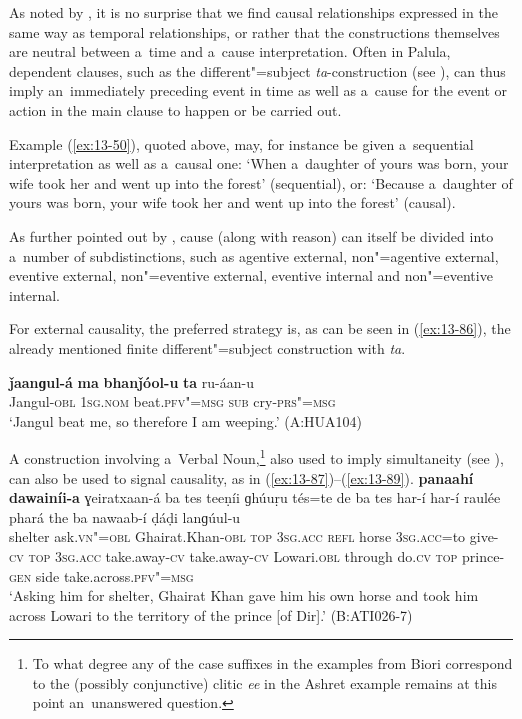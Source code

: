 As noted by \citet[247]{thompsonetal2007}, it is no surprise that we find causal relationships expressed in the same way as temporal relationships, or rather that the constructions themselves are neutral between a~time and a~cause interpretation. Often in Palula, dependent clauses, such as the different"=subject \textit{ta}-construction (see ), can thus imply an~immediately preceding event in time as well as a~cause for the event or action in the main clause to happen or be carried out. 



Example (\ref{ex:13-50}), quoted above, may, for instance be given a~sequential interpretation as well as a~causal one: `When a~daughter of yours was born, your wife took her and went up into the forest' (sequential), or: `Because a~daughter of yours was born, your wife took her and went up into the forest' (causal).



As further pointed out by \citet[335]{givon2001b}, cause (along with reason) can itself be divided into a~number of subdistinctions, such as agentive external, non"=agentive external, eventive external, non"=eventive external, eventive internal and non"=eventive internal.



For external causality, the preferred strategy is, as can be seen in (\ref{ex:13-86}), the already mentioned finite different"=subject construction with \textit{ta}.

\begin{exe}
\ex
\label{ex:13-86}
\gll \textbf{ǰaanɡul-á} \textbf{ma} \textbf{bhanǰóol-u} \textbf{ta} ru-áan-u  \\
Jangul-\textsc{obl} \textsc{1sg.nom} beat.\textsc{pfv"=msg} \textsc{sub} cry-\textsc{prs"=msg}  \\
\glt `Jangul beat me, so therefore I am weeping.' (A:HUA104)
\end{exe}

A construction involving a~Verbal Noun,\footnote{To what degree any of the case suffixes in the examples from Biori correspond to the (possibly conjunctive) clitic \textit{ee} in the Ashret example remains at this point an~unanswered question.} also used to imply simultaneity (see ), can also be used to signal causality, as in (\ref{ex:13-87})--(\ref{ex:13-89}).
\ea
\label{ex:13-87}
\gll \textbf{panaahí} \textbf{dawainíi-a} ɣeiratxaan-á ba tes teeṇíi ɡhúuṛu tés=te de ba tes har-í har-í raulée phará the ba nawaab-í ḍáḍi lanɡúul-u \\
shelter ask.\textsc{vn"=obl} Ghairat.Khan-\textsc{obl} \textsc{top} \textsc{3sg.acc} \textsc{refl}  horse \textsc{3sg.acc}=to give-\textsc{cv} \textsc{top} \textsc{3sg.acc} take.away-\textsc{cv} take.away-\textsc{cv} Lowari.\textsc{obl} through do.\textsc{cv} \textsc{top} prince-\textsc{gen} side take.across.\textsc{pfv"=msg} \\
\glt `Asking him for shelter, Ghairat Khan gave him his own horse and took him across Lowari to the territory of the prince [of Dir].' (B:ATI026-7)

